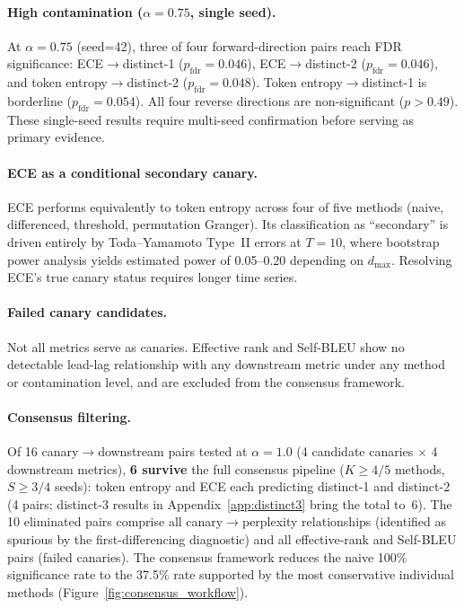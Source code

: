 \paragraph{High contamination ($\alpha{=}0.75$, single seed).}
At $\alpha{=}0.75$ (seed=42), three of four forward-direction pairs reach FDR significance: ECE$\to$distinct-1 ($p_\text{fdr}{=}0.046$), ECE$\to$distinct-2 ($p_\text{fdr}{=}0.046$), and token entropy$\to$distinct-2 ($p_\text{fdr}{=}0.048$).
Token entropy$\to$distinct-1 is borderline ($p_\text{fdr}{=}0.054$).
All four reverse directions are non-significant ($p{>}0.49$).
These single-seed results require multi-seed confirmation before serving as primary evidence.

\paragraph{ECE as a conditional secondary canary.}
ECE performs equivalently to token entropy across four of five methods (naive, differenced, threshold, permutation Granger).
Its classification as ``secondary'' is driven entirely by Toda--Yamamoto Type~II errors at $T{=}10$, where bootstrap power analysis yields estimated power of 0.05--0.20 depending on $d_{\max}$.
Resolving ECE's true canary status requires longer time series.

\paragraph{Failed canary candidates.}
Not all metrics serve as canaries.
Effective rank and Self-BLEU show no detectable lead-lag relationship with any downstream metric under any method or contamination level, and are excluded from the consensus framework.

\paragraph{Consensus filtering.}
Of 16 canary$\to$downstream pairs tested at $\alpha{=}1.0$ (4 candidate canaries $\times$ 4 downstream metrics), \textbf{6 survive} the full consensus pipeline ($K{\geq}4/5$ methods, $S{\geq}3/4$ seeds): token entropy and ECE each predicting distinct-1 and distinct-2 (4 pairs; distinct-3 results in Appendix~\ref{app:distinct3} bring the total to~6).
The 10 eliminated pairs comprise all canary$\to$perplexity relationships (identified as spurious by the first-differencing diagnostic) and all effective-rank and Self-BLEU pairs (failed canaries).
The consensus framework reduces the naive 100\% significance rate to the 37.5\% rate supported by the most conservative individual methods (Figure~\ref{fig:consensus_workflow}).


